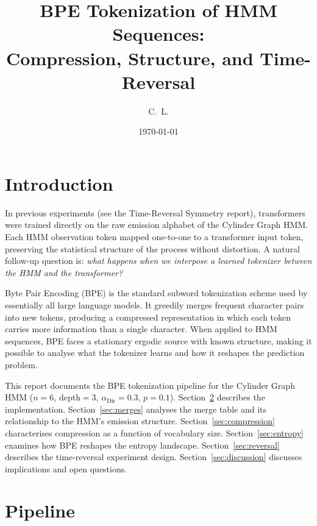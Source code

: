 \documentclass[11pt]{article}
\title{BPE Tokenization of HMM Sequences:\\
       Compression, Structure, and Time-Reversal}
\author{C.~L.}
\date{\today}
\begin{document}
\maketitle
\tableofcontents
\bigskip

\section{Introduction}

In previous experiments (see the Time-Reversal Symmetry report), transformers were trained directly on the raw emission alphabet of the Cylinder Graph HMM\@.  Each HMM observation token mapped one-to-one to a transformer input token, preserving the statistical structure of the process without distortion.  A natural follow-up question is: \emph{what happens when we interpose a learned tokenizer between the HMM and the transformer?}

Byte Pair Encoding (BPE) is the standard subword tokenization scheme used by essentially all large language models.  It greedily merges frequent character pairs into new tokens, producing a compressed representation in which each token carries more information than a single character.  When applied to HMM sequences, BPE faces a stationary ergodic source with known structure, making it possible to analyse what the tokenizer learns and how it reshapes the prediction problem.

This report documents the BPE tokenization pipeline for the Cylinder Graph HMM ($n{=}6$, depth${=}3$, $\alpha_{\mathrm{Dir}}{=}0.3$, $p{=}0.1$).  Section~\ref{sec:pipeline} describes the implementation.  Section~\ref{sec:merges} analyses the merge table and its relationship to the HMM's emission structure.  Section~\ref{sec:compression} characterises compression as a function of vocabulary size.  Section~\ref{sec:entropy} examines how BPE reshapes the entropy landscape.  Section~\ref{sec:reversal} describes the time-reversal experiment design.  Section~\ref{sec:discussion} discusses implications and open questions.

\section{Pipeline}\label{sec:pipeline}
\end{document}
